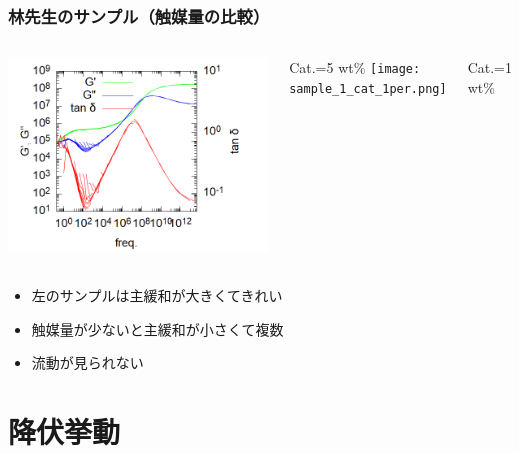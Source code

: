 \documentclass[1４pt, dvipdfmx]{beamer}
\begin{document}
\begin{frame}
	\frametitle{林先生のサンプル（触媒量の比較）}
		\begin{columns}[T, onlytextwidth]
			\centering
				\includegraphics[width=\textwidth]{sample_1.png}

				Cat.=5 wt\%
			\centering
			\texttt{[image: sample\_1\_cat\_1per.png]}

			Cat.=1 wt\%
		\end{columns}

		\begin{itemize}
			\item 左のサンプルは主緩和が大きくてきれい
			\item 触媒量が少ないと主緩和が小さくて複数
			\item 流動が見られない
		\end{itemize}
\end{frame}

\section{降伏挙動}

\end{document}

